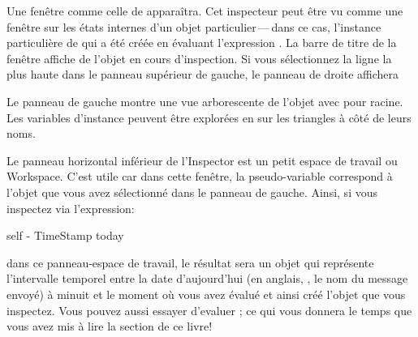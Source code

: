 \documentclass[a4paper,10pt,twoside]{book}
\begin{document}
Une fenêtre comme celle de  apparaîtra.
Cet inspecteur peut être vu comme une fenêtre sur les états internes
d'un objet particulier\,---\,dans ce cas, l'instance particulière
de
 \mbox{} 
qui a été créée en évaluant l'expression 
.
La barre de titre de la fenêtre affiche   de l'objet
en cours d'inspection.
Si vous sélectionnez la ligne la plus haute dans le panneau supérieur de gauche,
le panneau de droite affichera 

Le panneau de gauche montre une vue arborescente de l'objet
avec \self{} pour racine. Les variables d'instance peuvent être
explorées en \clickant{} sur les triangles à côté de leurs noms.%


Le panneau horizontal inférieur de l'Inspector est un petit espace de
travail ou Workspace.
C'est utile car dans cette fenêtre, la pseudo-variable 
correspond à l'objet que vous avez sélectionné dans le panneau de gauche. 
Ainsi, si vous inspectez via  l'expression:
\begin{code}{}
self - TimeStamp today
\end{code}
dans ce panneau-espace de travail, le résultat sera un objet 
 qui représente l'intervalle temporel entre 
la date d'aujourd'hui (en anglais, , le nom du message envoyé) à
minuit et le moment où vous avez évalué 
et ainsi créé l'objet  que vous inspectez.
Vous pouvez aussi essayer d'evaluer ; 
ce qui vous donnera le temps que vous avez mis à lire la section de ce livre!
\end{document}
